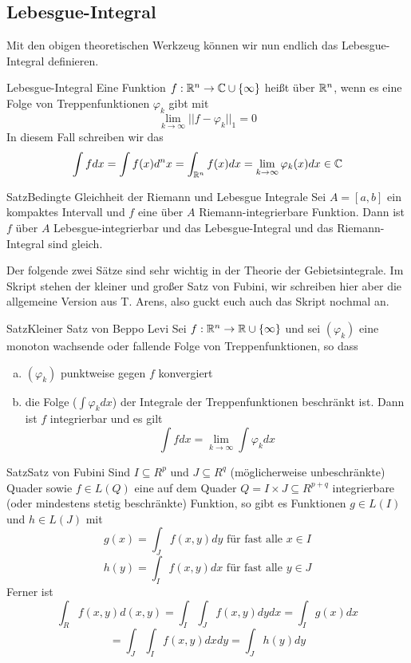 \subsection{Lebesgue-Integral}
Mit den obigen theoretischen Werkzeug können wir nun endlich das Lebesgue-Integral definieren.
\begin{Def}{Lebesgue-Integral}
Eine Funktion $f:\mathbb{R}^n\rightarrow\mathbb{C}\cup\{\infty\}$ heißt  über $\mathbb{R}^n$, wenn es eine Folge von Treppenfunktionen $\varphi_k$ gibt mit
$$\lim_{k\rightarrow \infty}||f-\varphi_k||_1=0$$
In diesem Fall schreiben wir das 
$$\int fdx = \int f(x) d^nx = \int_{\mathbb{R}^n} f(x)dx = \lim_{k\rightarrow\infty} \varphi_k(x)dx\in\mathbb{C}$$
\end{Def}
\begin{Satz}{Satz}{Bedingte Gleichheit der Riemann und Lebesgue Integrale}
Sei $A=[a,b]$ ein kompaktes Intervall und $f$ eine über $A$ Riemann-integrierbare Funktion. Dann ist $f$ über $A$ Lebesgue-integrierbar und das Lebesgue-Integral und das Riemann-Integral sind gleich.
\end{Satz}
Der folgende zwei Sätze sind sehr wichtig in der Theorie der Gebietsintegrale. Im Skript stehen der kleiner und großer Satz von Fubini, wir schreiben hier aber die allgemeine Version aus T. Arens, also guckt euch auch das Skript nochmal an.
\begin{Satz}{Satz}{Kleiner Satz von Beppo Levi}
Sei $f:\mathbb{R}^n\rightarrow \mathbb{R}\cup \{\infty\}$ und sei $(\varphi_k)$ eine monoton wachsende oder fallende Folge von Treppenfunktionen, so dass
\begin{enumerate}[a)]
    \item $(\varphi_k)$ punktweise gegen $f$ konvergiert
    \item die Folge ($\int \varphi_k dx$) der Integrale der Treppenfunktionen beschränkt ist.
    Dann ist $f$ integrierbar und es gilt
    $$\int f dx=\lim_{k\rightarrow \infty}\int \varphi_k dx$$
\end{enumerate}
\end{Satz}
\begin{Satz}{Satz}{Satz von Fubini}
Sind $I\subseteq R^p$ und $J\subseteq R^q$ (möglicherweise unbeschränkte) Quader sowie $f\in L(Q)$ eine auf dem Quader $Q=I\times J \subseteq R^{p+q}$ integrierbare (oder mindestens stetig beschränkte) Funktion, so gibt es Funktionen $g\in L(I)$ und $h\in L(J)$ mit
$$g(x)=\int_J f(x,y) dy \mbox{ für fast alle $x\in I$}$$
$$h(y)=\int_I f(x,y)dx \mbox{ für fast alle $y\in J$}$$
Ferner ist 
$$\int_R f(x,y) d(x,y) = \int_I\int_J f(x,y) dy dx = \int_I g(x) dx$$
$$=\int_J\int_I f(x,y) dx dy = \int_J h(y) dy$$

\end{Satz}
